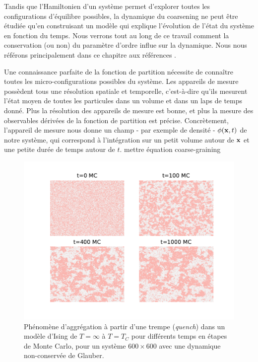 Tandis que l'Hamiltonien d'un système permet d'explorer toutes les configurations d'équilibre possibles, la dynamique du coarsening ne peut être étudiée qu'en construisant un modèle qui explique l'évolution de l'état du système en fonction du temps. Nous verrons tout au long de ce travail comment la conservation (ou non) du paramètre d'ordre influe sur la dynamique. Nous nous référons principalement dans ce chapitre aux références \cite{hohenberg_theory_1977,bray_theory_1994,krapivsky_kinetic_2010,halpin-healy_kinetic_1995}.

Une connaissance parfaite de la fonction de partition nécessite de connaître toutes les micro-configurations possibles du système. Les appareils de mesure possèdent tous une résolution spatiale et temporelle, c'est-à-dire qu'ils mesurent l'état moyen de toutes les particules dans un volume et dans un laps de temps donné. Plus la résolution des appareils de mesure est bonne, et plus la mesure des observables dérivées de la fonction de partition est précise. 
Concrètement, l'appareil de mesure nous donne un champ - par exemple de densité - $\phi({\bf x},t)$ de notre système, qui correspond à l'intégration sur un petit volume autour de ${\bf x}$ et une petite durée de temps autour de $t$.
{\color{red} mettre équation coarse-graining} 

\begin{figure}[h]
    \centering
    \includegraphics[width=0.9\linewidth]{intro/clusterization.pdf}
    \caption{Phénomène d'aggrégation à partir d'une trempe (\textit{quench}) dans un modèle d'Ising de $T=\infty$ à $T=T_C$ pour différents temps en étapes de Monte Carlo, pour un système $600 \times 600$ avec une dynamique non-conservée de Glauber.}
    \label{clusterization}
\end{figure}

